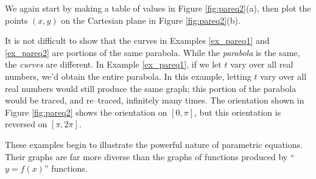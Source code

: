 {We again start by making a table of values in Figure \ref{fig:pareq2}(a), then plot the points $(x,y)$ on the Cartesian plane in Figure \ref{fig:pareq2}(b).

It is not difficult to show that the curves in Examples \ref{ex_pareq1} and \ref{ex_pareq2} are portions of the same parabola. While the \textit{parabola} is the same, the \textit{curves} are different. In Example \ref{ex_pareq1}, if we let $t$ vary over all real numbers, we'd obtain the entire parabola. In this example, letting $t$ vary over all real numbers would still produce the same graph; this portion of the parabola would be traced, and re--traced, infinitely many times. The orientation shown in Figure \ref{fig:pareq2} shows the orientation on $[0,\pi]$, but this orientation is reversed on $[\pi,2\pi]$.

These examples begin to illustrate the powerful nature of parametric equations. Their graphs are far more diverse than the graphs of functions produced by ``$y=f(x)$'' functions.
}\\

